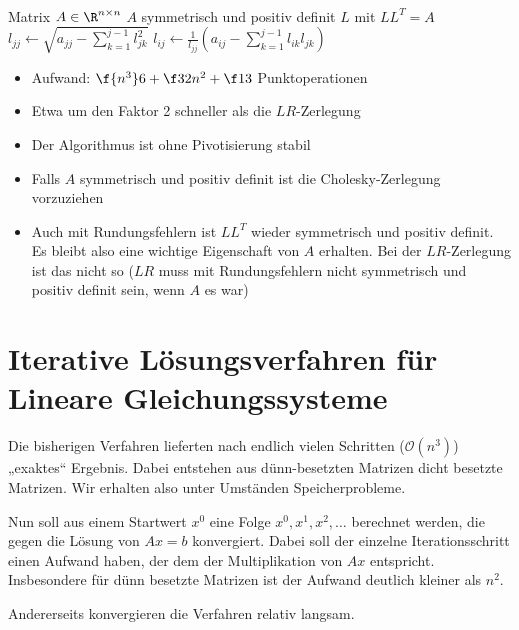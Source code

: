\documentclass{mycourse}
\begin{document}
\begin{alg}~
	\label{alg:3.15}
	\begin{algorithmic}
		\Input Matrix $A\in \R^{n\times n}$
		\Assume $A$ symmetrisch und positiv definit
		\Output $L$ mit $LL^T = A$
		\Statex
			\State $\displaystyle l_{jj} \gets \sqrt{a_{jj} - \sum_{k=1}^{j-1}l_{jk}^2}$
				\State $\displaystyle l_{ij} \gets \frac 1{l_{jj}} \left(a_{ij}-\sum_{k=1}^{j-1} l_{ik}l_{jk}\right)$
			\EndFor
		\EndFor
	\end{algorithmic}
	\begin{itemize}
		\item Aufwand: $\f {n^3}6 +\f32 n^2 +\f 13$ Punktoperationen
		\item Etwa um den Faktor 2 schneller als die $LR$-Zerlegung
		\item Der Algorithmus ist ohne Pivotisierung stabil
		\item Falls $A$ symmetrisch und positiv definit ist die Cholesky-Zerlegung vorzuziehen
		\item Auch mit Rundungsfehlern ist $LL^T$ wieder symmetrisch und positiv definit.
			Es bleibt also eine wichtige Eigenschaft von $A$ erhalten.
			Bei der $LR$-Zerlegung ist das nicht so ($LR$ muss mit Rundungsfehlern nicht symmetrisch und positiv definit sein, wenn $A$ es war)
	\end{itemize}
\end{alg}


\chapter{Iterative Lösungsverfahren für Lineare Gleichungssysteme}


Die bisherigen Verfahren lieferten nach endlich vielen Schritten ($\mathcal O(n^3)$) „exaktes“ Ergebnis.
Dabei entstehen aus dünn-besetzten Matrizen dicht besetzte Matrizen.
Wir erhalten also unter Umständen Speicherprobleme.

Nun soll aus einem Startwert $x^0$ eine Folge $x^0, x^1, x^2, \dotsc$ berechnet werden, die gegen die Lösung von $Ax=b$ konvergiert.
Dabei soll der einzelne Iterationsschritt einen Aufwand haben, der dem der Multiplikation von $Ax$ entspricht. 
Insbesondere für dünn besetzte Matrizen ist der Aufwand deutlich kleiner als $n^2$.

Andererseits konvergieren die Verfahren relativ langsam.
\end{document}
